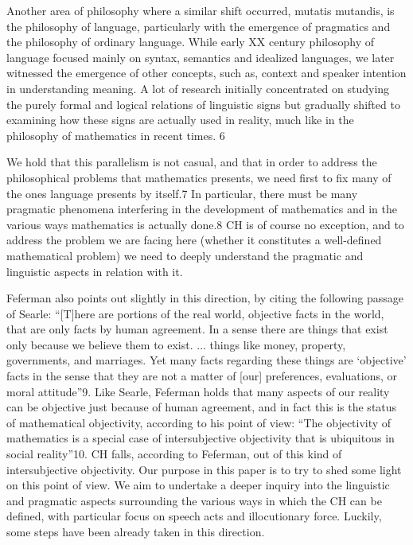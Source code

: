 \documentclass[11pt,a4paper]{book}
\theoremstyle{plain}
\begin{document}
Another area of philosophy where a similar shift occurred, mutatis mutandis, is the philosophy of language, particularly with the emergence of pragmatics and the philosophy of ordinary language. While early XX century philosophy of language focused mainly on syntax, semantics and idealized languages, we later witnessed the emergence of other concepts, such as, context and speaker intention in understanding meaning. A lot of research initially concentrated on studying the purely formal and logical relations of linguistic signs but gradually shifted to examining how these signs are actually used in reality, much like in the philosophy of mathematics in recent times. 6 

We hold that this parallelism is not casual, and that in order to address the philosophical problems that mathematics presents, we need first to fix many of the ones language presents by itself.7 In particular, there must be many pragmatic phenomena interfering in the development of mathematics and in the various ways mathematics is actually done.8 CH is of course no exception, and to address the problem we are facing here (whether it constitutes a well-defined mathematical problem) we need to deeply understand the pragmatic and linguistic aspects in relation with it. 

Feferman also points out slightly in this direction, by citing the following passage of Searle: “[T]here are portions of the real world, objective facts in the world, that are only facts by human agreement. In a sense there are things that exist only because we believe them to exist. ... things like money, property, governments, and marriages. Yet many facts regarding these things are ‘objective’ facts in the sense that they are not a matter of [our] preferences, evaluations, or moral attitude”9. Like Searle, Feferman holds that many aspects of our reality can be objective just because of human agreement, and in fact this is the status of mathematical objectivity, according to his point of view: “The objectivity of mathematics is a special case of intersubjective objectivity that is ubiquitous in social reality”10. CH falls, according to Feferman, out of this kind of intersubjective objectivity. Our purpose in this paper is to try to shed some light on this point of view. We aim to undertake a deeper inquiry into the linguistic and pragmatic aspects surrounding the various ways in which the CH can be defined, with particular focus on speech acts and illocutionary force. Luckily, some steps have been already taken in this direction. 
\end{document}
